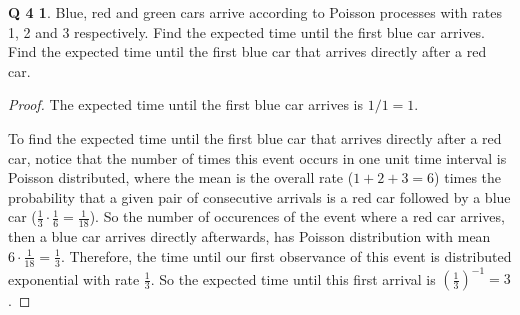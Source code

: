 \documentclass[12pt]{article}
\theoremstyle{definition}
\newtheorem*{prob4}{Q 4}
\begin{document}
\begin{prob4}
Blue, red and green cars arrive according to Poisson processes with rates 1, 2 and 3 respectively.  Find the expected time until the first blue car arrives.  Find the expected time until the first blue car that arrives directly after a red car.
\end{prob4}

\begin{proof}
The expected time until the first blue car arrives is $1/1 = 1$.

To find the expected time until the first blue car that arrives directly after a red car, notice that the number of times this event occurs in one unit time interval is Poisson distributed, where the mean is the overall rate ($1 + 2 + 3 = 6$) times the probability that a given pair of consecutive arrivals is a red car followed by a blue car ($\frac13 \cdot \frac16 = \frac{1}{18}$).  So the number of occurences of the event where a red car arrives, then a blue car arrives directly afterwards, has Poisson distribution with mean $6 \cdot \frac{1}{18} = \frac13$.  Therefore, the time until our first observance of this event is distributed exponential with rate $\frac13$.  So the expected time until this first arrival is $(\frac13)^{-1} = 3$.
\end{proof}
\end{document}
